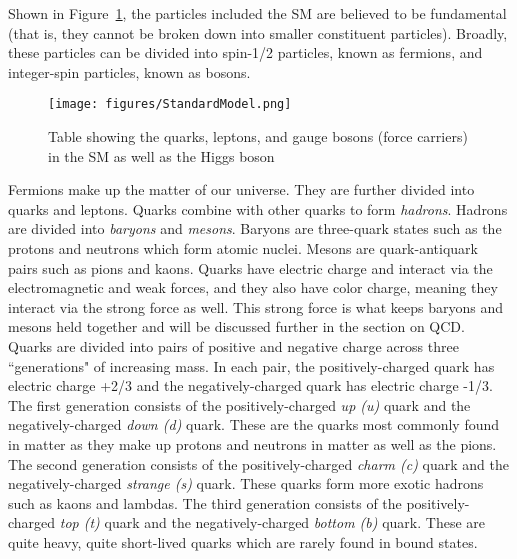 Shown in Figure~\ref{fig:StandardModel}, the particles included the SM are believed to be fundamental (that is, they cannot be broken down into smaller constituent particles). Broadly, these particles can be divided into spin-1/2 particles, known as fermions, and integer-spin particles, known as bosons. 

\begin{figure}
\centering
  \texttt{[image: figures/StandardModel.png]}
  \caption{\label{fig:StandardModel} Table showing the quarks, leptons, and gauge bosons (force carriers) in the SM as well as the Higgs boson\cite{StandardModelTable}}
\end{figure}


Fermions make up the matter of our universe. They are further divided into quarks and leptons. Quarks combine with other quarks to form \textit{hadrons}. Hadrons are divided into \textit{baryons} and \textit{mesons}. Baryons are three-quark states such as the protons and neutrons which form atomic nuclei. Mesons are quark-antiquark pairs such as pions and kaons. Quarks have electric charge and interact via the electromagnetic and weak forces, and they also have color charge, meaning they interact via the strong force as well. This strong force is what keeps baryons and mesons held together and will be discussed further in the section on QCD. Quarks are divided into pairs of positive and negative charge across three ``generations" of increasing mass. In each pair, the positively-charged quark has electric charge +2/3 and the negatively-charged quark has electric charge -1/3. The first generation consists of the positively-charged \textit{up (u)} quark and the negatively-charged \textit{down (d)} quark. These are the quarks most commonly found in matter as they make up protons and neutrons in matter as well as the pions. The second generation consists of the positively-charged \textit{charm (c)} quark and the negatively-charged \textit{strange (s)} quark. These quarks form more exotic hadrons such as kaons and lambdas. The third generation consists of the positively-charged \textit{top (t)} quark and the negatively-charged \textit{bottom (b)} quark. These are quite heavy, quite short-lived quarks which are rarely found in bound states.

